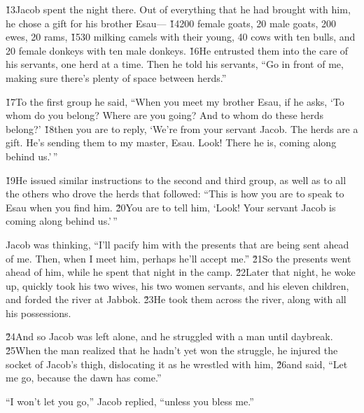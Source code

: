 \v{13}Jacob spent the night there. Out of everything that he had brought with him, he chose a gift for his brother Esau--- \v{14}200 female goats, 20 male goats, 200 ewes, 20 rams, \v{15}30 milking camels with their young, 40 cows with ten bulls, and 20 female donkeys with ten male donkeys. \v{16}He entrusted them into the care of his servants, one herd at a time. Then he told his servants, ``Go in front of me, making sure there's plenty of space between herds.''

\v{17}To the first group he said, ``When you meet my brother Esau, if he asks, `To whom do you belong? Where are you going? And to whom do these herds belong?' \v{18}then you are to reply, `We're from your servant Jacob. The herds are a gift. He's sending them to my master, Esau. Look! There he is, coming along behind us.'\,''

\v{19}He issued similar instructions to the second and third group, as well as to all the others who drove the herds that followed: ``This is how you are to speak to Esau when you find him. \v{20}You are to tell him, `Look! Your servant Jacob is coming along behind us.'\,''

Jacob was thinking, ``I'll pacify him with the presents that are being sent ahead of me. Then, when I meet him, perhaps he'll accept me.'' \v{21}So the presents went ahead of him, while he spent that night in the camp. \v{22}Later that night, he woke up, quickly took his two wives, his two women servants, and his eleven children, and forded the river at Jabbok. \v{23}He took them across the river, along with all his possessions.

\v{24}And so Jacob was left alone, and he struggled with a man until daybreak. \v{25}When the man realized that he hadn't yet won the struggle, he injured the socket of Jacob's thigh, dislocating it as he wrestled with him, \v{26}and said, ``Let me go, because the dawn has come.''

``I won't let you go,'' Jacob replied, ``unless you bless me.''

